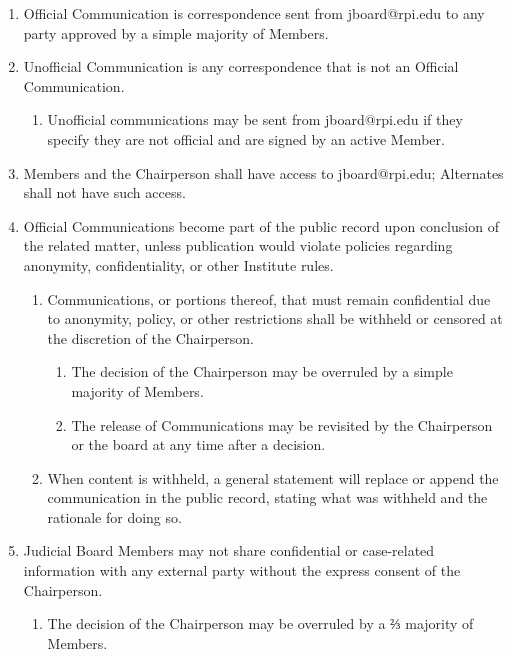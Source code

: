 \begin{enumerate}
    \item Official Communication is correspondence sent from jboard@rpi.edu to any party approved by a simple majority of Members.
    \item Unofficial Communication is any correspondence that is not an Official Communication.
    \begin{enumerate}
        \item Unofficial communications may be sent from jboard@rpi.edu if they specify they are not official and are signed by an active Member.
    \end{enumerate}
    \item Members and the Chairperson shall have access to jboard@rpi.edu; Alternates shall not have such access.
    \item Official Communications become part of the public record upon conclusion of the related matter, unless publication would violate policies regarding anonymity, confidentiality, or other Institute rules.
    \begin{enumerate}
        \item Communications, or portions thereof, that must remain confidential due to anonymity, policy, or other restrictions shall be withheld or censored at the discretion of the Chairperson.
        \begin{enumerate}
            \item The decision of the Chairperson may be overruled by a simple majority of Members.
            \item The release of Communications may be revisited by the Chairperson or the board at any time after a decision.
        \end{enumerate}
        \item When content is withheld, a general statement will replace or append the communication in the public record, stating what was withheld and the rationale for doing so.
    \end{enumerate}
    \item Judicial Board Members may not share confidential or case-related information with any external party without the express consent of the Chairperson.
    \begin{enumerate}
        \item The decision of the Chairperson may be overruled by a ⅔ majority of Members.
    \end{enumerate}
\end{enumerate}

